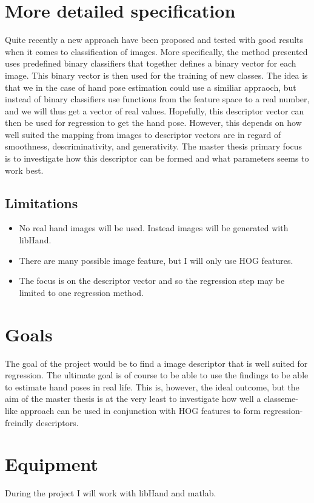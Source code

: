 \documentclass[12pt]{article}
\begin{document}
\section*{More detailed specification}
Quite recently a new approach have been proposed and tested with good results when it comes to classification of images.
More specifically, the method presented uses predefined binary classifiers that together defines a binary vector for each image.
This binary vector is then used for the training of new classes.
The idea is that we in the case of hand pose estimation could use a similiar appraoch, but instead of binary classifiers use functions from the feature space to a real number, and we will thus get a vector of real values. 
Hopefully, this descriptor vector can then be used for regression to get the hand pose.
However, this depends on how well suited the mapping from images to descriptor vectors are in regard of smoothness, descriminativity, and generativity.
The master thesis primary focus is to investigate how this descriptor can be formed and what parameters seems to work best.

\subsection*{Limitations}
\begin{itemize}
\item
No real hand images will be used. Instead images will be generated with libHand.
\item
There are many possible image feature, but I will only use HOG features.
\item
The focus is on the descriptor vector and so the regression step may be limited to one regression method.
\end{itemize}

\section*{Goals}
The goal of the project would be to find a image descriptor that is well suited for regression.
The ultimate goal is of course to be able to use the findings to be able to estimate hand poses in real life.
This is, however, the ideal outcome, but the aim of the master thesis is at the very least to investigate how well a classeme-like approach can be used in conjunction with HOG features to form regression-freindly descriptors.

\section*{Equipment}
During the project I will work with libHand and matlab.
\end{document}
